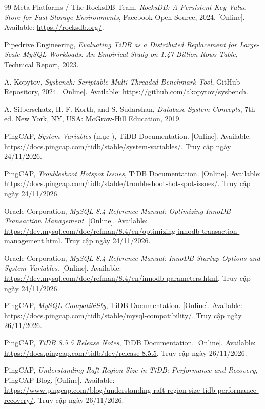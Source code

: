 \begin{thebibliography}{99}
Meta Platforms / The RocksDB Team, \textit{RocksDB: A Persistent Key-Value Store for Fast Storage Environments}, Facebook Open Source, 2024. [Online]. Available: \url{https://rocksdb.org/}.

Pipedrive Engineering, \textit{Evaluating TiDB as a Distributed Replacement for Large-Scale MySQL Workloads: An Empirical Study on 1.47 Billion Rows Table}, Technical Report, 2023.

A. Kopytov, \textit{Sysbench: Scriptable Multi-Threaded Benchmark Tool}, GitHub Repository, 2024. [Online]. Available: \url{https://github.com/akopytov/sysbench}.

A. Silberschatz, H. F. Korth, and S. Sudarshan, \textit{Database System Concepts}, 7th ed. New York, NY, USA: McGraw-Hill Education, 2019.

PingCAP, \textit{System Variables} (mục ), TiDB Documentation. [Online]. Available: \url{https://docs.pingcap.com/tidb/stable/system-variables/}. Truy cập ngày 24/11/2026.

PingCAP, \textit{Troubleshoot Hotspot Issues}, TiDB Documentation. [Online]. Available: \url{https://docs.pingcap.com/tidb/stable/troubleshoot-hot-spot-issues/}. Truy cập ngày 24/11/2026.

Oracle Corporation, \textit{MySQL 8.4 Reference Manual: Optimizing InnoDB Transaction Management}. [Online]. Available: \url{https://dev.mysql.com/doc/refman/8.4/en/optimizing-innodb-transaction-management.html}. Truy cập ngày 24/11/2026.

Oracle Corporation, \textit{MySQL 8.4 Reference Manual: InnoDB Startup Options and System Variables}. [Online]. Available: \url{https://dev.mysql.com/doc/refman/8.4/en/innodb-parameters.html}. Truy cập ngày 24/11/2026.

PingCAP, \textit{MySQL Compatibility}, TiDB Documentation. [Online]. Available: \url{https://docs.pingcap.com/tidb/stable/mysql-compatibility/}. Truy cập ngày 26/11/2026.

PingCAP, \textit{TiDB 8.5.5 Release Notes}, TiDB Documentation. [Online]. Available: \url{https://docs.pingcap.com/tidb/dev/release-8.5.5}. Truy cập ngày 26/11/2026.

PingCAP, \textit{Understanding Raft Region Size in TiDB: Performance and Recovery}, PingCAP Blog. [Online]. Available: \url{https://www.pingcap.com/blog/understanding-raft-region-size-tidb-performance-recovery/}. Truy cập ngày 26/11/2026.

\end{thebibliography}
